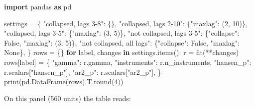 \documentclass[
  10.5pt,
  a4paper,
]{article}
\newenvironment{Shaded}{}{}
\newcommand{\BuiltInTok}[1]{\textcolor[rgb]{0.00,0.50,0.00}{#1}}
\newcommand{\ControlFlowTok}[1]{\textcolor[rgb]{0.00,0.44,0.13}{\textbf{#1}}}
\newcommand{\DecValTok}[1]{\textcolor[rgb]{0.25,0.63,0.44}{#1}}
\newcommand{\ImportTok}[1]{\textcolor[rgb]{0.00,0.50,0.00}{\textbf{#1}}}
\newcommand{\KeywordTok}[1]{\textcolor[rgb]{0.00,0.44,0.13}{\textbf{#1}}}
\newcommand{\NormalTok}[1]{#1}
\newcommand{\OperatorTok}[1]{\textcolor[rgb]{0.40,0.40,0.40}{#1}}
\newcommand{\StringTok}[1]{\textcolor[rgb]{0.25,0.44,0.63}{#1}}
\newcommand{\VariableTok}[1]{\textcolor[rgb]{0.10,0.09,0.49}{#1}}
\begin{document}
\begin{Shaded}
\begin{Highlighting}[]
\ImportTok{import}\NormalTok{ pandas }\ImportTok{as}\NormalTok{ pd}

\NormalTok{settings }\OperatorTok{=}\NormalTok{ \{}
    \StringTok{"collapsed, lags 3{-}8"}\NormalTok{: \{\},}
    \StringTok{"collapsed, lags 2{-}10"}\NormalTok{: \{}\StringTok{"maxlag"}\NormalTok{: (}\DecValTok{2}\NormalTok{, }\DecValTok{10}\NormalTok{)\},}
    \StringTok{"collapsed, lags 3{-}5"}\NormalTok{: \{}\StringTok{"maxlag"}\NormalTok{: (}\DecValTok{3}\NormalTok{, }\DecValTok{5}\NormalTok{)\},}
    \StringTok{"not collapsed, lags 3{-}5"}\NormalTok{: \{}\StringTok{"collapse"}\NormalTok{: }\VariableTok{False}\NormalTok{, }\StringTok{"maxlag"}\NormalTok{: (}\DecValTok{3}\NormalTok{, }\DecValTok{5}\NormalTok{)\},}
    \StringTok{"not collapsed, all lags"}\NormalTok{: \{}\StringTok{"collapse"}\NormalTok{: }\VariableTok{False}\NormalTok{, }\StringTok{"maxlag"}\NormalTok{: }\VariableTok{None}\NormalTok{\},}
\NormalTok{\}}
\NormalTok{rows }\OperatorTok{=}\NormalTok{ \{\}}
\ControlFlowTok{for}\NormalTok{ label, changes }\KeywordTok{in}\NormalTok{ settings.items():}
\NormalTok{    r }\OperatorTok{=}\NormalTok{ fit(}\OperatorTok{**}\NormalTok{changes)}
\NormalTok{    rows[label] }\OperatorTok{=}\NormalTok{ \{}
        \StringTok{"gamma"}\NormalTok{: r.gamma,}
        \StringTok{"instruments"}\NormalTok{: r.n\_instruments,}
        \StringTok{"hansen\_p"}\NormalTok{: r.scalars[}\StringTok{"hansen\_p"}\NormalTok{],}
        \StringTok{"ar2\_p"}\NormalTok{: r.scalars[}\StringTok{"ar2\_p"}\NormalTok{],}
\NormalTok{    \}}
\BuiltInTok{print}\NormalTok{(pd.DataFrame(rows).T.}\BuiltInTok{round}\NormalTok{(}\DecValTok{4}\NormalTok{))}
\end{Highlighting}
\end{Shaded}

On this panel (560 units) the table reads:
\end{document}
